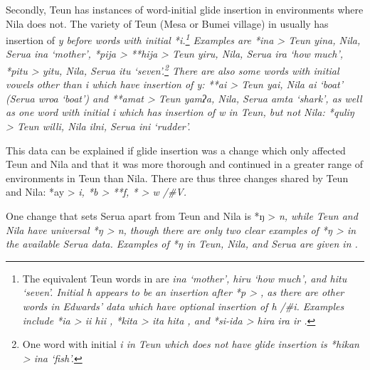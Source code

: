 Secondly, Teun has instances of word-initial glide insertion
in environments where Nila does not.
The variety of Teun (Mesa or Bumei village) in \citet{Taber1993}
usually has insertion of \it{y} before words with initial *i.\footnote{
		The equivalent Teun words in \citet{Edwards2023} are \it{ina} ‘mother’,
		\it{hiru} ‘how much’, and \it{hitu} ‘seven’.
		Initial \it{h} appears to be an insertion after *p > {\0},
		as there are other words in Edwards’ data which have optional
		insertion of \it{h} /{\#}i{\gap}.
		Examples include *ia > \it{ii {\tl} hii} ,
		*kita > \it{ita {\tl} hita} ,
		and *si-ida > \it{hira {\tl} ira {\tl} ir} .}
Examples are *ina > Teun \it{yina},
Nila, Serua \it{ina} ‘mother’, *pija > **hija > Teun \it{yiru},
Nila, Serua \it{ira} ‘how much’,
*pitu > \it{yitu}, Nila,
Serua \it{itu} ‘seven’.\footnote{
		One word with initial \it{i}
		in Teun which does not have glide insertion
		is *hikan > \it{ina} ‘fish’.}
There are also some words with initial vowels other
than \it{i} which have insertion of \it{y}: **ai > Teun \it{yai},
Nila \it{ai} ‘boat’ (Serua \it{wroa} ‘boat’)
and **amat > Teun \it{yamʔa},
Nila, Serua \it{amta} ‘shark’, as well as one word with initial
\it{i} which has insertion of \it{w} in Teun,
but not Nila: *quliŋ > Teun \it{willi},
Nila \it{ilni}, Serua \it{ini} ‘rudder’.

This data can be explained if glide insertion was a change which
only affected Teun and Nila and that it was more thorough
and continued in a greater range of environments in Teun than Nila.
There are thus three changes shared by Teun
and Nila: *ay > \it{i},
*b > **f, *{\0} > \it{w} /{\#}{\gap}V.

One change that sets Serua apart from Teun
and Nila is *ŋ > \it{n},
{\0} while Teun and Nila have universal
*ŋ > \it{n}, though there
are only two clear examples of *ŋ > {\0}
in the available Serua data.
Examples of *ŋ in Teun,
Nila, and Serua are given in .


